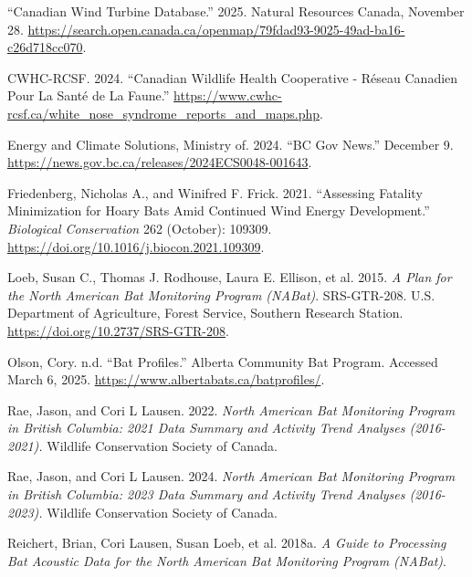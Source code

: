\documentclass[
  letterpaper,
  DIV=11,
  numbers=noendperiod]{scrartcl}
\newlength{\cslhangindent}
\newenvironment{CSLReferences}[2] %
 {\begin{list}{}{%
  \setlength{\itemindent}{0pt}
  \setlength{\leftmargin}{0pt}
  \setlength{\parsep}{0pt}
  \ifodd #1
   \setlength{\leftmargin}{\cslhangindent}
   \setlength{\itemindent}{-1\cslhangindent}
  \fi
  \setlength{\itemsep}{#2\baselineskip}}}
 {\end{list}}
\begin{document}
\protect{}\label{refs}
\begin{CSLReferences}{1}{1}
{``Canadian Wind Turbine Database.''} 2025. Natural Resources Canada,
November 28.
\url{https://search.open.canada.ca/openmap/79fdad93-9025-49ad-ba16-c26d718cc070}.

CWHC-RCSF. 2024. {``Canadian {Wildlife Health Cooperative} - {Réseau}
Canadien Pour La Santé de La Faune.''}
\url{https://www.cwhc-rcsf.ca/white_nose_syndrome_reports_and_maps.php}.

Energy and Climate Solutions, Ministry of. 2024. {``{BC Gov News}.''}
December 9. \url{https://news.gov.bc.ca/releases/2024ECS0048-001643}.

Friedenberg, Nicholas A., and Winifred F. Frick. 2021. {``Assessing
Fatality Minimization for Hoary Bats Amid Continued Wind Energy
Development.''} \emph{Biological Conservation} 262 (October): 109309.
\url{https://doi.org/10.1016/j.biocon.2021.109309}.

Loeb, Susan C., Thomas J. Rodhouse, Laura E. Ellison, et al. 2015.
\emph{A Plan for the {North American Bat Monitoring Program} ({NABat})}.
SRS-GTR-208. U.S. Department of Agriculture, Forest Service, Southern
Research Station. \url{https://doi.org/10.2737/SRS-GTR-208}.

Olson, Cory. n.d. {``Bat {Profiles}.''} Alberta Community Bat Program.
Accessed March 6, 2025. \url{https://www.albertabats.ca/batprofiles/}.

Rae, Jason, and Cori L Lausen. 2022. \emph{North {American Bat
Monitoring Program} in {British Columbia}: 2021 {Data Summary} and
{Activity Trend Analyses} (2016-2021).} Wildlife Conservation Society of
Canada.

Rae, Jason, and Cori L Lausen. 2024. \emph{North {American Bat
Monitoring Program} in {British Columbia}: 2023 {Data Summary} and
{Activity Trend Analyses} (2016-2023).} Wildlife Conservation Society of
Canada.

Reichert, Brian, Cori Lausen, Susan Loeb, et al. 2018a. \emph{A Guide to
Processing Bat Acoustic Data for the North American Bat Monitoring
Program (NABat)}.


\end{CSLReferences}
\end{document}
